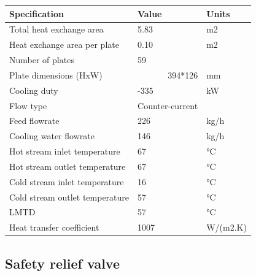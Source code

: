 \begin{table}[H]
\centering
\begin{tabular}{@{}l|l|l@{}}
\toprule
\textbf{Specification}           & \textbf{Value}                       & \textbf{Units} \\ \midrule
Total heat   exchange area       & 5.83                                 & m2             \\ \midrule
Heat exchange   area per plate   & 0.10                                 & m2             \\ \midrule
Number of   plates               & 59                                   &                \\ \midrule
Plate   dimensions (HxW)         & \multicolumn{1}{r|}{394*126}         & mm             \\ \midrule
Cooling duty                     & -335                                 & kW             \\ \midrule
Flow type                        & \multicolumn{1}{r|}{Counter-current} &                \\ \midrule
Feed flowrate                    & 226                                  & kg/h           \\ \midrule
Cooling water   flowrate         & 146                                  & kg/h           \\ \midrule
Hot stream   inlet temperature   & 67                                   & °C             \\ \midrule
Hot stream   outlet temperature  & 67                                   & °C             \\ \midrule
Cold stream   inlet temperature  & 16                                   & °C             \\ \midrule
Cold stream   outlet temperature & 57                                   & °C             \\ \midrule
LMTD                             & 57                                   & °C             \\ \midrule
Heat transfer   coefficient      & 1007                                 & W/(m2.K)       \\ \bottomrule
\end{tabular}
\end{table}


\newpage
\subsection{Safety relief valve}

